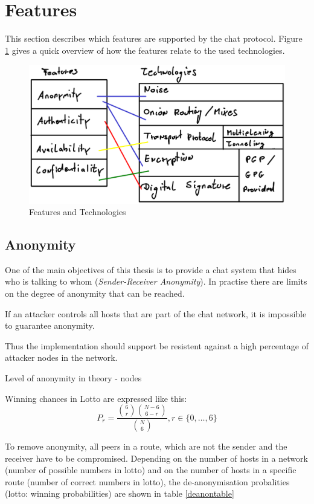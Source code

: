 \section{Features}
This section describes which features are supported by the chat protocol.
Figure \ref{features-technologies} gives a quick overview of how the
features relate to the used technologies.
\begin{figure}
    \centering
    \caption{Features and Technologies}
    \label{features-technologies}
    \includegraphics[scale=0.8]{features-technologies.eps}
\end{figure}
\subsection{Anonymity}
One of the main objectives of this thesis is to provide a chat system that
hides who is talking to whom (\textit{Sender-Receiver Anonymity}). 
In practise there are limits on the degree of anonymity that can be reached.


If an attacker controls all hosts that are 
part of the chat network, it is impossible to guarantee anonymity.

Thus the implementation should support be resistent against a high percentage
of attacker nodes in the network.

Level of anonymity in theory - nodes

Winning chances in Lotto are expressed like this:
$$P_r = \frac{{\binom{6}{r}}{\binom{N-6}{6-r}}}{{\binom{N}{6}}}, r \in \{0, \ldots, 6\}$$

To remove anonymity, all peers in a route, which are not the 
sender and the receiver have to be compromised.
Depending on the number of hosts in a network (number of possible
numbers in lotto) and on the number of hosts in a specific route
(number of correct numbers in lotto), the de-anonymisation
probalities (lotto: winning probabilities) are shown in table
\ref{deanontable}

